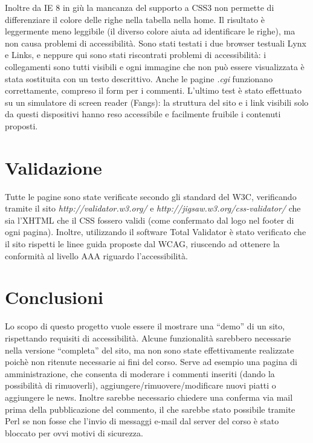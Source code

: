 \documentclass[10pt,a4paper,onecolumn]{article}
\begin{document}
Inoltre da IE 8 in giù la mancanza del supporto a CSS3 non permette di differenziare il colore delle righe nella tabella nella home. Il risultato è leggermente meno leggibile (il diverso colore aiuta ad identificare le righe), ma non causa problemi di accessibilità.
Sono stati testati i due browser testuali Lynx e Links, e neppure qui sono stati riscontrati problemi di accessibilità: i collegamenti sono tutti visibili e ogni immagine che non può essere visualizzata è stata sostituita con un testo descrittivo. Anche le pagine \textit{.cgi} funzionano correttamente, compreso il form per i commenti.
L'ultimo test è stato effettuato su un simulatore di screen reader (Fangs): la struttura del sito e i link visibili solo da questi dispositivi hanno reso accessibile e facilmente fruibile i contenuti proposti.

\section{Validazione}

Tutte le pagine sono state verificate secondo gli standard del W3C, verificando tramite il sito \textit{http://validator.w3.org/} e \textit{http://jigsaw.w3.org/css-validator/} che sia l’XHTML che il CSS fossero validi (come confermato dal logo nel footer di ogni pagina).
Inoltre, utilizzando il software Total Validator è stato verificato che il sito rispetti le linee guida proposte dal WCAG, riuscendo ad ottenere la conformità al livello AAA riguardo l’accessibilità.

\section{Conclusioni}

Lo scopo di questo progetto vuole essere il mostrare una ``demo'' di un sito, rispettando requisiti di accessibilità. Alcune funzionalità sarebbero necessarie nella versione “completa” del sito, ma non sono state effettivamente realizzate poichè non ritenute necessarie ai  fini del corso.
Serve ad esempio una pagina di amministrazione, che consenta di moderare i commenti inseriti (dando la possibilità di rimuoverli), aggiungere/rimuovere/modificare nuovi piatti o aggiungere le news. Inoltre sarebbe necessario chiedere una conferma via mail prima della pubblicazione del commento, il che sarebbe stato possibile tramite Perl se non fosse che l’invio di messaggi e-mail dal server del corso è stato bloccato per ovvi motivi di sicurezza.
\end{document}
